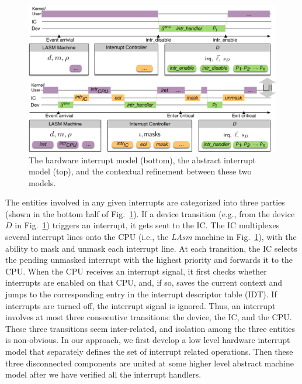 \begin{figure}[t]
	\begin{center}
		\includegraphics[scale=0.4]{figs/interrupt}
	\end{center}
	\caption{The hardware interrupt model (bottom), the
          abstract interrupt model (top), and the contextual
          refinement between these two models.}
	\label{fig:interrupt}
\end{figure}

The entities involved in any given interrupts are categorized into three parties
(shown in the bottom half of Fig.~\ref{fig:interrupt}).  If a device transition
(e.g., from the device $D$ in Fig.~\ref{fig:interrupt}) triggers an interrupt,
it gets sent to the IC.  The IC multiplexes several interrupt lines onto the CPU
(i.e., the \textit{LAsm} machine in Fig.~\ref{fig:interrupt}), with the ability
to mask and unmask each interrupt line. At each transition, the IC selects the
pending unmasked interrupt with the highest priority and forwards it to the CPU.
When the CPU receives an interrupt signal, it first checks whether interrupts
are enabled on that CPU, and, if so, saves the current context and jumps to the
corresponding entry in the interrupt descriptor table (IDT). If interrupts are
turned off, the interrupt signal is ignored. Thus, an interrupt involves at most
three consecutive transitions: the device, the IC, and the CPU.  These three
transitions seem inter-related, and isolation among the three entities is
non-obvious.  In our approach, we first develop a low level hardware interrupt
model that separately defines the set of interrupt related operations.  Then
these three disconnected components are united at some higher level abstract
machine model after we have verified all the interrupt handlers.


